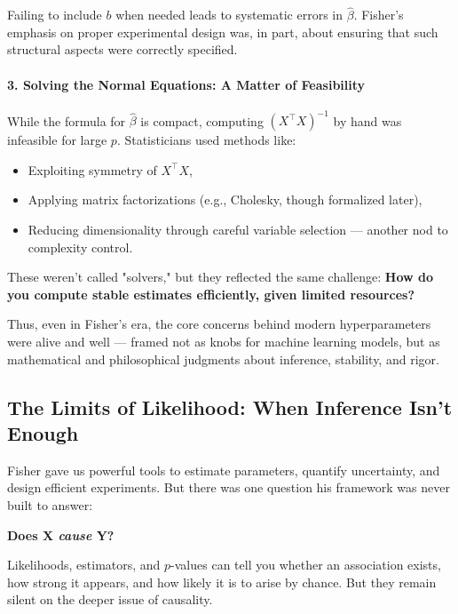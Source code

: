 \begin{tcolorbox}[title=\textbf{Mathematical Considerations: Fisher-Era Decisions}, colback=gray!5, colframe=black, fonttitle=\bfseries]
Failing to include \( b \) when needed leads to systematic errors in \( \hat{\beta} \). Fisher’s emphasis on proper experimental design was, in part, about ensuring that such structural aspects were correctly specified.

\medskip

\paragraph{3. Solving the Normal Equations: A Matter of Feasibility}
While the formula for \( \hat{\beta} \) is compact, computing \( (X^\top X)^{-1} \) by hand was infeasible for large \( p \). Statisticians used methods like:

\begin{itemize}
    \item Exploiting symmetry of \( X^\top X \),
    \item Applying matrix factorizations (e.g., Cholesky, though formalized later),
    \item Reducing dimensionality through careful variable selection — another nod to complexity control.
\end{itemize}

These weren’t called "solvers," but they reflected the same challenge: \textbf{How do you compute stable estimates efficiently, given limited resources?}

\end{tcolorbox}

\medskip

Thus, even in Fisher’s era, the core concerns behind modern hyperparameters were alive and well — framed not as knobs for machine learning models, but as mathematical and philosophical judgments about inference, stability, and rigor.




\subsection{The Limits of Likelihood: When Inference Isn’t Enough}

Fisher gave us powerful tools to estimate parameters, quantify uncertainty, and design efficient experiments. But there was one question his framework was never built to answer:

\begin{center}
\textbf{Does X \emph{cause} Y?}
\end{center}

Likelihoods, estimators, and \( p \)-values can tell you whether an association exists, how strong it appears, and how likely it is to arise by chance. But they remain silent on the deeper issue of causality.

